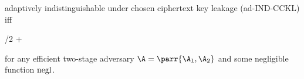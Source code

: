\begin{definition}
\begin{sitemize}
        \item adaptively indistinguishable under chosen ciphertext key leakage (ad-IND-CCKL) iff
        \begin{bralign}
            /2 + \varepsilon\parr{\secpar}
        \end{bralign}
    \end{sitemize}
    for any efficient two-stage adversary \(\A = \parr{\A_1, \A_2}\) and some negligible function \(\operatorname{negl}\).
\end{definition}